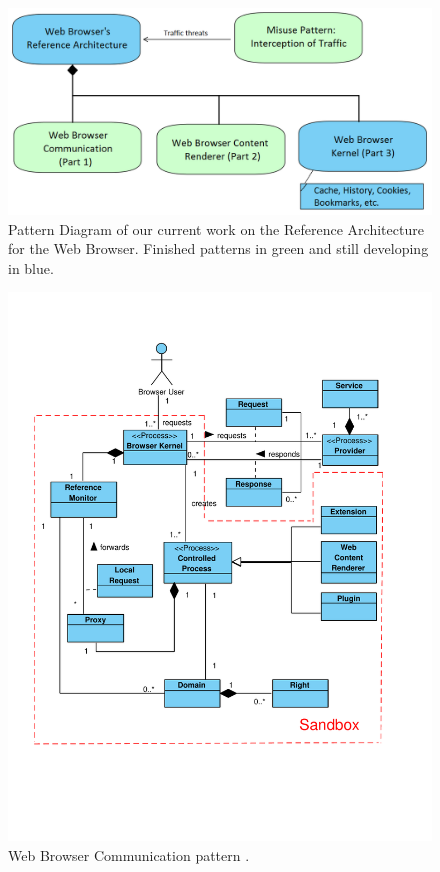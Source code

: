 \documentclass[]{acmlarge}
\begin{document}
    \begin{figure}[h!t]
      \centering
      \hspace{0.5cm}\includegraphics[scale=0.43]{figures/relations-finish.png}
      \vspace*{0.5cm}
      \caption{Pattern Diagram of our current work on the Reference Architecture for the Web Browser. Finished patterns in green and still developing in blue.}
      \label{fig:relations}
    \end{figure}

    \begin{figure}[h!t]
      \vspace*{-1.5cm}
      \centering
      \includegraphics[scale=0.55]{figures/BrowserInfrastructure-v3.pdf}
      \vspace*{-2.3cm}
      \caption{Web Browser Communication pattern \cite{silva2015}.}
      \label{fig:WBCP}
    \end{figure}
\end{document}
